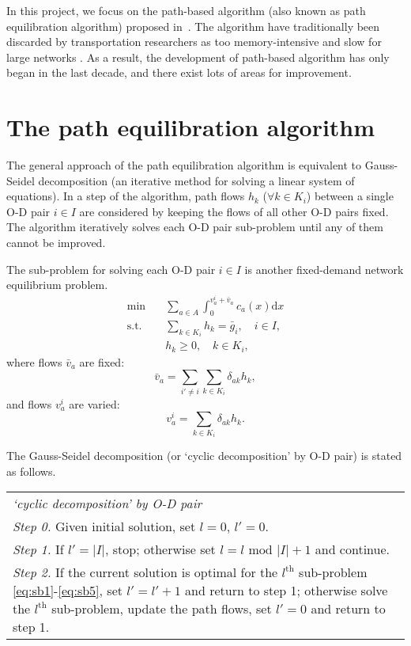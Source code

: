 In this project, we focus on the path-based algorithm (also known as path equilibration algorithm) proposed in~\citet{Dafermos1969}.
The algorithm have traditionally been discarded by transportation researchers as too memory-intensive and slow for large networks \citep{Jayakrishnan1994}.
As a result, the development of path-based algorithm has only began in the last decade, and there exist lots of areas for improvement.

\section{The path equilibration algorithm}
The general approach of the path equilibration algorithm is equivalent to
Gauss-Seidel decomposition (an iterative method for solving a linear system of equations).
In a step of the algorithm,
path flows $h_k$ ($\forall k \in K_i$) between a single O-D pair $i \in I$ are considered by keeping the flows of all other O-D pairs fixed.
The algorithm iteratively solves each O-D pair sub-problem until any of them cannot be improved.

The sub-problem for solving each O-D pair $i \in I$ is another fixed-demand network equilibrium problem.
\begin{align} \label{eq:sb1}
    \min & \quad \sum_{a \in A} \int_0^{v_a^i + \bar{v}_a} c_a(x) \mathrm{d} x \\
    \text{s.t.} &\quad \sum_{k \in K_i} h_k = \bar{g}_i, \quad i \in I, \\
    & \quad h_k \geq 0, \quad k \in K_i,
\end{align}
where flows $\bar{v}_a$ are fixed:
\begin{equation}
    \bar{v}_a = \sum_{i' \neq i} \sum_{k \in K_i} \delta_{ak} h_k,
\end{equation}
and flows $v_a^i$ are varied:
\begin{equation} \label{eq:sb5}
    v_a^i = \sum_{k \in K_i} \delta_{ak} h_k.
\end{equation}

The Gauss-Seidel decomposition (or `cyclic decomposition' by O-D pair) is stated as follows.
\begin{table}[H]
    \begin{tabular}{ m{} }
        \hspace{-.5cm}\emph{`cyclic decomposition' by O-D pair} \citep{Florian} \\
        \emph{Step 0.} Given initial solution, set $l = 0$, $l' = 0$.\\
        \emph{Step 1.} If $l' = |I|$, stop; otherwise set $l = l \text{ mod } |I| + 1$ and continue.\\
        \emph{Step 2.} If the current solution is optimal for the $l^\text{th}$ sub-problem \eqref{eq:sb1}-\eqref{eq:sb5}, set $l' = l' + 1$ and return to step 1; otherwise solve the $l^\text{th}$ sub-problem, update the path flows, set $l' = 0$ and return to step 1.\\
    \end{tabular}
\end{table}

